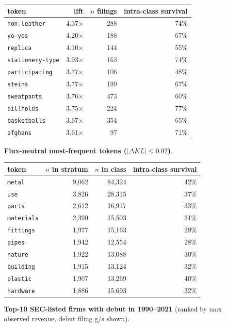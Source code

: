 \begin{tabular}{lrrr}
\toprule
token & lift & $n$ filings & intra-class survival \\
\midrule
\texttt{non-leather} & 4.37$\times$ & 288 & 74\% \\
\texttt{yo-yos} & 4.20$\times$ & 188 & 67\% \\
\texttt{replica} & 4.10$\times$ & 144 & 55\% \\
\texttt{stationery-type} & 3.93$\times$ & 163 & 74\% \\
\texttt{participating} & 3.77$\times$ & 106 & 48\% \\
\texttt{steins} & 3.77$\times$ & 199 & 67\% \\
\texttt{sweatpants} & 3.76$\times$ & 473 & 60\% \\
\texttt{billfolds} & 3.75$\times$ & 224 & 77\% \\
\texttt{basketballs} & 3.67$\times$ & 354 & 65\% \\
\texttt{afghans} & 3.61$\times$ & 97 & 71\% \\
\bottomrule
\end{tabular}

\textbf{Flux-neutral most-frequent tokens ($|\Delta KL|\leq 0.02$)}.

\begin{tabular}{lrrr}
\toprule
token & $n$ in stratum & $n$ in class & intra-class survival \\
\midrule
\texttt{metal} & 9,062 & 84,324 & 42\% \\
\texttt{use} & 3,826 & 28,315 & 37\% \\
\texttt{parts} & 2,612 & 16,917 & 33\% \\
\texttt{materials} & 2,390 & 15,503 & 31\% \\
\texttt{fittings} & 1,977 & 15,163 & 29\% \\
\texttt{pipes} & 1,942 & 12,554 & 28\% \\
\texttt{nature} & 1,922 & 13,088 & 30\% \\
\texttt{building} & 1,915 & 13,124 & 32\% \\
\texttt{plastic} & 1,907 & 13,269 & 40\% \\
\texttt{hardware} & 1,886 & 15,693 & 32\% \\
\bottomrule
\end{tabular}

\textbf{Top-10 SEC-listed firms with debut in 1990--2021} (ranked by max observed revenue, debut filing g/s shown).

